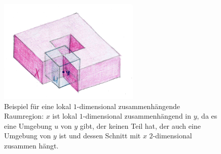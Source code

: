     \begin{figure}[ht]
            \centering
            \includegraphics[width=0.6\textwidth]{bearbeitet-22-04-25/loc1dc.png}
            \caption[Beispiel für eine lokal $1$-dimensional zusammenhängende Raumregion]{Beispiel für eine lokal $1$-dimensional zusammenhängende Raumregion: $x$ ist lokal $1$-dimensional zusammenhängend in $y$, da es eine Umgebung $u$ von $y$ gibt, der keinen Teil hat, der auch eine Umgebung von $y$ ist und dessen Schnitt mit $x$ $2$-dimensional zusammen hängt.}
            \label{fig:loc1dc}
    \end{figure}
